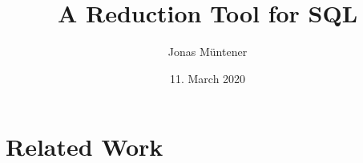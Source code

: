 \documentclass[]{article}
\title{A Reduction Tool for SQL}
\author{Jonas Müntener}
\date{11. March 2020}
\begin{document}
\maketitle

\begin{abstract}

\end{abstract}

\section{Related Work}
\cite{rigger2020testing}
\cite{regehr2012reduction}
\cite{sun2019perses}
\cite{jung2019apollo}



\end{document}

